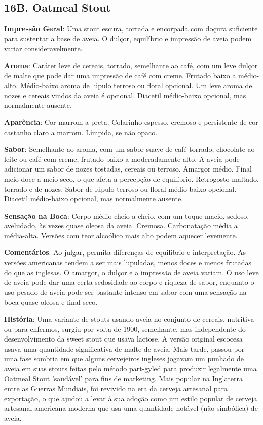 \subsection*{16B. Oatmeal Stout}
\textbf{Impressão Geral}: Uma stout escura, torrada e encorpada com doçura suficiente para sustentar a base de aveia. O dulçor, equilíbrio e impressão de aveia podem variar consideravelmente.

\textbf{Aroma}: Caráter leve de cereais, torrado, semelhante ao café, com um leve dulçor de malte que pode dar uma impressão de café com creme. Frutado baixo a médio-alto. Médio-baixo aroma de lúpulo terroso ou floral opcional. Um leve aroma de nozes e cereais vindos da aveia é opcional. Diacetil médio-baixo opcional, mas normalmente ausente.

\textbf{Aparência}: Cor marrom a preta. Colarinho espesso, cremoso e persistente de cor castanho claro a marrom. Límpida, se não opaco.

\textbf{Sabor}: Semelhante ao aroma, com um sabor suave de café torrado, chocolate ao leite ou café com creme, frutado baixo a moderadamente alto. A aveia pode adicionar um sabor de nozes tostadas, cereais ou terroso. Amargor médio. Final meio doce a meio seco, o que afeta a percepção de equilíbrio. Retrogosto maltado, torrado e de nozes. Sabor de lúpulo terroso ou floral médio-baixo opcional. Diacetil médio-baixo opcional, mas normalmente ausente.

\textbf{Sensação na Boca}: Corpo médio-cheio a cheio, com um toque macio, sedoso, aveludado, às vezes quase oleosa da aveia. Cremosa. Carbonatação média a média-alta. Versões com teor alcoólico mais alto podem aquecer levemente.

\textbf{Comentários}: Ao julgar, permita diferenças de equilíbrio e interpretação. As versões americanas tendem a ser mais lupuladas, menos doces e menos frutadas do que as inglesas. O amargor, o dulçor e a impressão de aveia variam. O uso leve de aveia pode dar uma certa sedosidade ao corpo e riqueza de sabor, enquanto o uso pesado de aveia pode ser bastante intenso em sabor com uma sensação na boca quase oleosa e final seco.

\textbf{História}: Uma variante de stouts usando aveia no conjunto de cereais, nutritiva ou para enfermos, surgiu por volta de 1900, semelhante, mas independente do desenvolvimento da sweet stout que usava lactose. A versão original escocesa usava uma quantidade significativa de malte de aveia. Mais tarde, passou por uma fase sombria em que alguns cervejeiros ingleses jogavam um punhado de aveia em suas stouts feitas pelo método part-gyled para produzir legalmente uma Oatmeal Stout 'saudável' para fins de marketing. Mais popular na Inglaterra entre as Guerras Mundiais, foi revivido na era da cerveja artesanal para exportação, o que ajudou a levar à sua adoção como um estilo popular de cerveja artesanal americana moderna que usa uma quantidade notável (não simbólica) de aveia.

